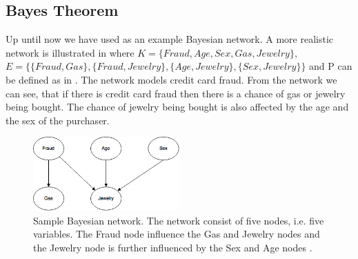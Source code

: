 \subsection{Bayes Theorem}

Up until now we have used  as an example Bayesian network. A more realistic network is illustrated in  where $K = \{Fraud, Age, Sex, Gas, Jewelry\}$, $E = \{\{Fraud, Gas\}, \{Fraud, Jewelry\}, \{Age, Jewelry\}, \{Sex, Jewelry\}\}$ and P can be defined as in . The network models credit card fraud. From the network we can see, that if there is credit card fraud then there is a chance of gas or jewelry being bought. The chance of jewelry being bought is also affected by the age and the sex of the purchaser.

\begin{figure}[h!]
\centering
\includegraphics[width=0.5\textwidth]{images/sample_bayesian_network}
\caption{Sample Bayesian network. The network consist of five nodes, i.e. five variables. The Fraud node influence the Gas and Jewelry nodes and the Jewelry node is further influenced by the Sex and Age nodes \cite{stephenson2000introduction}.}
\label{fig:analysis:bayesian-network:sample}
\end{figure}

